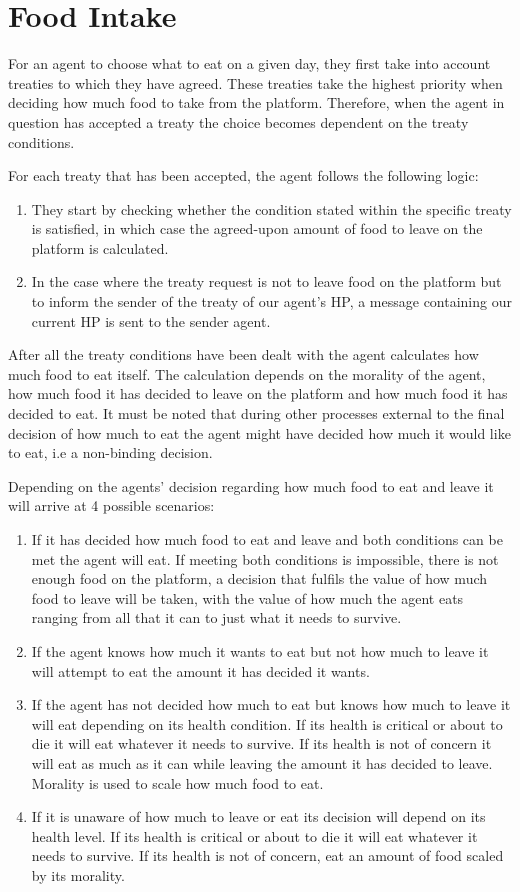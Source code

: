 \section{Food Intake}\label{sec:food_intake}
For an agent to choose what to eat on a given day, they first take into account treaties to which they have agreed. These treaties take the highest priority when deciding how much food to take from the platform. Therefore, when the agent in question has accepted a treaty the choice becomes dependent on the treaty conditions. \par 
For each treaty that has been accepted, the agent follows the following logic: 
\begin{enumerate}
    \item They start by checking whether the condition stated within the specific treaty is satisfied, in which case the agreed-upon amount of food to leave on the platform is calculated. 
    \item In the case where the treaty request is not to leave food on the platform but to inform the sender of the treaty of our agent's HP, a message containing our current HP is sent to the sender agent. 
\end{enumerate}
After all the treaty conditions have been dealt with the agent calculates how much food to eat itself. The calculation depends on the morality of the agent, how much food it has decided to leave on the platform and how much food it has decided to eat. It must be noted that during other processes external to the final decision of how much to eat the agent might have decided how much it would like to eat, i.e a non-binding decision. \par
Depending on the agents’ decision regarding how much food to eat and leave it will arrive at 4 possible scenarios: 
\begin{enumerate}
    \item If it has decided how much food to eat and leave and both conditions can be met the agent will eat. If meeting both conditions is impossible, there is not enough food on the platform, a decision that fulfils the value of how much food to leave will be taken, with the value of how much the agent eats ranging from all that it can to just what it needs to survive. 
    \item If the agent knows how much it wants to eat but not how much to leave it will attempt to eat the amount it has decided it wants.
    \item If the agent has not decided how much to eat but knows how much to leave it will eat depending on its health condition. If its health is critical or about to die it will eat whatever it needs to survive. If its health is not of concern it will eat as much as it can while leaving the amount it has decided to leave. Morality is used to scale how much food to eat.
    \item If it is unaware of how much to leave or eat its decision will depend on its health level. If its health is critical or about to die it will eat whatever it needs to survive. If its health is not of concern, eat an amount of food scaled by its morality.
\end{enumerate}